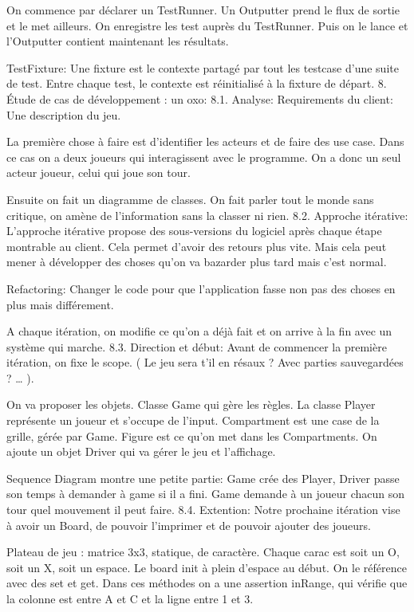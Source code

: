 On commence par déclarer un TestRunner. Un Outputter prend le flux de sortie et le met ailleurs.
On enregistre les test auprès du TestRunner. Puis on le lance et l’Outputter contient maintenant les résultats.

TestFixture: Une fixture est le contexte partagé par tout les testcase d’une suite de test.
Entre chaque test, le contexte est réinitialisé à la fixture de départ.
8. Étude de cas de développement : un oxo:
8.1. Analyse:
Requirements du client: Une description du jeu.

La première chose à faire est d’identifier les acteurs et de faire des use case. Dans ce cas on a deux joueurs qui interagissent avec le programme. On a donc un seul acteur joueur, celui qui joue son tour.

Ensuite on fait un diagramme de classes. On fait parler tout le monde sans critique, on amène de l’information sans la classer ni rien.
8.2. Approche itérative:
L’approche itérative propose des sous-versions du logiciel après chaque étape montrable au client. Cela permet d’avoir des retours plus vite. Mais cela peut mener à développer des choses qu’on va bazarder plus tard mais c’est normal.

Refactoring: Changer le code pour que l’application fasse non pas des choses en plus mais différement.

A chaque itération, on modifie ce qu’on a déjà fait et on arrive à la fin avec un système qui marche.
8.3. Direction et début:
Avant de commencer la première itération, on fixe le scope. ( Le jeu sera t’il en résaux ? Avec parties sauvegardées ? … ).

On va proposer les objets. Classe Game qui gère les règles. La classe Player représente un joueur et s’occupe de l’input. Compartment est une case de la grille, gérée par Game. Figure est ce qu’on met dans les Compartments. On ajoute un objet Driver qui va gérer le jeu et l’affichage.

Sequence Diagram montre une petite partie: Game crée des Player, Driver passe son temps à demander à game si il a fini. Game demande à un joueur chacun son tour quel mouvement il peut faire.
8.4. Extention:
Notre prochaine itération vise à avoir un Board, de pouvoir l’imprimer et de pouvoir ajouter des joueurs.

Plateau de jeu : matrice 3x3, statique, de caractère. Chaque carac est soit un O, soit un X, soit un espace. Le board init à plein d’espace au début. On le référence avec des set et get.
Dans ces méthodes on a une assertion inRange, qui vérifie que la colonne est entre A et C et la ligne entre 1 et 3.


